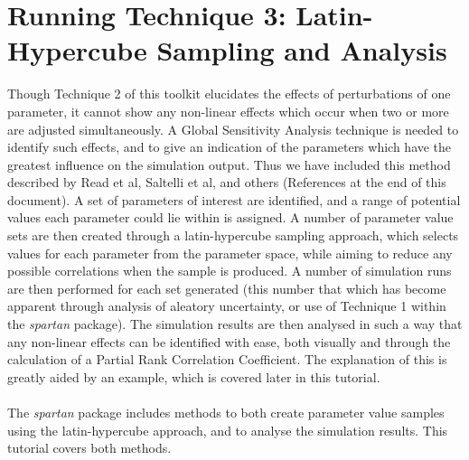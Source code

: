 \documentclass[a4paper,11pt]{article}
\begin{document}
\section{Running Technique 3: Latin-Hypercube Sampling and Analysis}
\noindent Though Technique 2 of this toolkit elucidates the effects of perturbations of one parameter, it cannot show any non-linear effects which occur when two or more are adjusted simultaneously. A Global Sensitivity Analysis technique is needed to identify such effects, and to give an indication of the parameters which have the greatest influence on the simulation output. Thus we have included this method described by Read et al, Saltelli et al, and others (References at the end of this document). A set of parameters of interest are identified, and a range of potential values each parameter could lie within is assigned. A number of parameter value sets are then created through a latin-hypercube sampling approach, which selects values for each parameter from the parameter space, while aiming to reduce any possible correlations when the sample is produced.  A number of simulation runs are then performed for each set generated (this number that which has become apparent through analysis of aleatory uncertainty, or use of Technique 1 within the \textit{spartan} package). The simulation results are then analysed in such a way that any non-linear effects can be identified with ease, both visually and through the calculation of a Partial Rank Correlation Coefficient.  The explanation of this is greatly aided by an example, which is covered later in this tutorial. \\
\\
The \textit{spartan} package includes methods to both create parameter value samples using the latin-hypercube approach, and to analyse the simulation results. This tutorial covers both methods.\\
\end{document}
